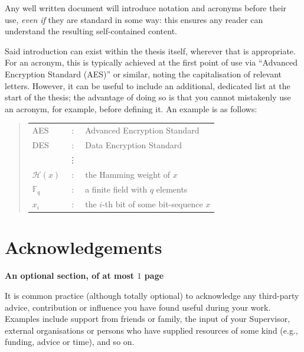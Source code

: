 \documentclass[ %
                    author={Luke Murray},
                supervisor={Dr. Simon Hollis},
                     title={Shadow Peer-to-Peer Networks},
                  subtitle={},
                    degree={MEng},
                      year={2013} ]{thesis}
\begin{document}
\noindent
Any well written document will introduce notation and acronyms before their 
use, {\em even if} they are standard in some way: this ensures any reader 
can understand the resulting self-contained content.  

Said introduction can exist within the thesis itself, wherever that is
appropriate.  For an acronym, this is typically achieved at the first point 
of use via ``Advanced Encryption Standard (AES)'' or similar, noting the 
capitalisation of relevant letters.  However, it can be useful to include 
an additional, dedicated list at the start of the thesis; the advantage of 
doing so is that you cannot mistakenly use an acronym, for example, 
before defining it.  An example is as follows:

\begin{quote}
\noindent
\begin{tabular}{lcl}
AES                 &:     & Advanced Encryption Standard            \\
DES                 &:     & Data Encryption Standard                \\
                    &\vdots&                                         \\
${\mathcal H}( x )$ &:     & the Hamming weight of $x$               \\
${\mathbb  F}_q$    &:     & a finite field with $q$ elements        \\
$x_i$               &:     & the $i$-th bit of some bit-sequence $x$ \\
\end{tabular}
\end{quote}


\chapter*{Acknowledgements}

{\bf An optional section, of at most $1$ page}
\vspace{1cm} 

\noindent
It is common practice (although totally optional) to acknowledge any
third-party advice, contribution or influence you have found useful
during your work.  Examples include support from friends or family, 
the input of your Supervisor, external organisations or persons who 
have supplied resources of some kind (e.g., funding, advice or time),
and so on.
\end{document}
